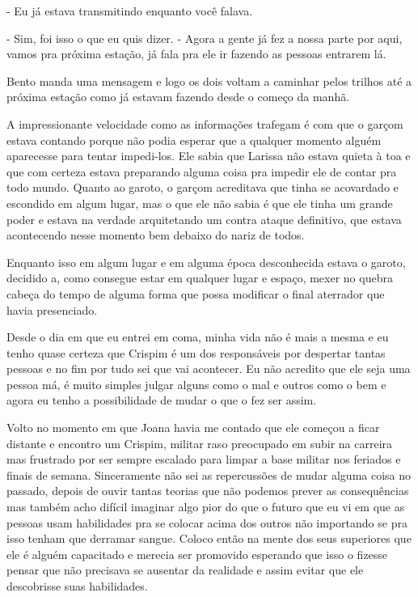 - Eu já estava transmitindo enquanto você falava.

- Sim, foi isso o que eu quis dizer. - Agora a gente já fez a nossa parte por aqui, vamos pra próxima estação, já fala pra ele ir fazendo as pessoas entrarem lá.


Bento manda uma mensagem e logo os dois voltam a caminhar pelos trilhos até a próxima estação como já estavam fazendo desde o começo da manhã.

A impressionante velocidade como as informações trafegam é com que o garçom estava contando porque não podia esperar que a qualquer momento alguém aparecesse para tentar impedi-los. Ele sabia que Larissa não estava quieta à toa e que com certeza estava preparando alguma coisa pra impedir ele de contar pra todo mundo. Quanto ao garoto, o garçom acreditava que tinha se acovardado e escondido em algum lugar, mas o que ele não sabia é que ele tinha um grande poder e estava na verdade arquitetando um contra ataque definitivo, que estava acontecendo nesse momento bem debaixo do nariz de todos.

Enquanto isso em algum lugar e em alguma época desconhecida estava o garoto, decidido a, como consegue estar em qualquer lugar e espaço, mexer no quebra cabeça do tempo de alguma forma que possa modificar o final aterrador que havia presenciado.

Desde o dia em que eu entrei em coma, minha vida não é mais a mesma e eu tenho quase certeza que Crispim é um dos responsáveis por despertar tantas pessoas e no fim por tudo sei que vai acontecer. Eu não acredito que ele seja uma pessoa má, é muito simples julgar alguns como o mal e outros como o bem e agora eu tenho a possibilidade de mudar o que o fez ser assim.

Volto no momento em que Joana havia me contado que ele começou a ficar distante e encontro um Crispim, militar raso preocupado em subir na carreira mas frustrado por ser sempre escalado para limpar a base militar nos feriados e finais de semana. Sinceramente não sei as repercussões de mudar alguma coisa no passado, depois de ouvir tantas teorias que não podemos prever as consequências mas também acho difícil imaginar algo pior do que o futuro que eu vi em que as pessoas usam habilidades pra se colocar acima dos outros não importando se pra isso tenham que derramar sangue. Coloco então na mente dos seus superiores que ele é alguém capacitado e merecia ser promovido esperando que isso o fizesse pensar que não precisava se ausentar da realidade e assim evitar que ele descobrisse suas habilidades.

